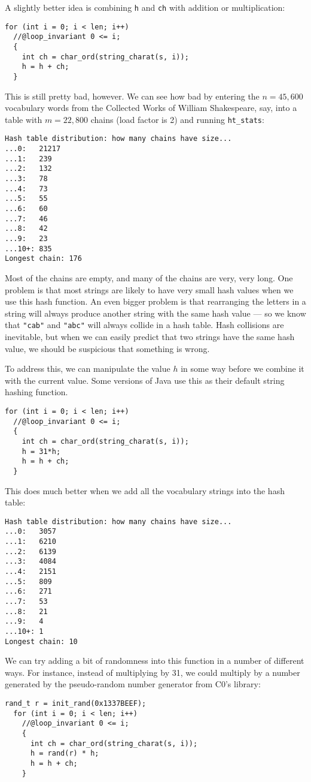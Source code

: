 A slightly better idea is combining \lstinline'h' and \lstinline'ch' with
addition or multiplication:
\begin{lstlisting}[language={[C0]C}]
  for (int i = 0; i < len; i++)
  //@loop_invariant 0 <= i;
  {
    int ch = char_ord(string_charat(s, i));
    h = h + ch;
  }
\end{lstlisting}

\noindent
This is still pretty bad, however. We can see how bad by entering the
$n = 45,600$ vocabulary words from the Collected Works of William
Shakespeare, say, into a table with $m = 22,800$ chains (load factor
is 2) and running \lstinline'ht_stats':
\begin{lstlisting}[language={[coin]C}]
Hash table distribution: how many chains have size...
...0:   21217
...1:   239
...2:   132
...3:   78
...4:   73
...5:   55
...6:   60
...7:   46
...8:   42
...9:   23
...10+: 835
Longest chain: 176
\end{lstlisting}
Most of the chains are empty, and many of the chains are very, very
long.  One problem is that most strings are likely to have very small
hash values when we use this hash function. An even bigger problem is
that rearranging the letters in a string will always produce another
string with the same hash value --- so we know that \lstinline'"cab"' and
\lstinline'"abc"' will always collide in a hash table. Hash collisions are
inevitable, but when we can easily predict that two strings have the
same hash value, we should be suspicious that something is wrong.

To address this, we can manipulate the value $h$ in some way before we
combine it with the current value. Some versions of Java use this as their
default string hashing function.
\begin{lstlisting}[language={[C0]C}]
  for (int i = 0; i < len; i++)
  //@loop_invariant 0 <= i;
  {
    int ch = char_ord(string_charat(s, i));
    h = 31*h;
    h = h + ch;
  }
\end{lstlisting}

\noindent
This does much better when we add all the vocabulary strings into the
hash table:
\begin{lstlisting}[language={[coin]C}]
Hash table distribution: how many chains have size...
...0:   3057
...1:   6210
...2:   6139
...3:   4084
...4:   2151
...5:   809
...6:   271
...7:   53
...8:   21
...9:   4
...10+: 1
Longest chain: 10
\end{lstlisting}

We can try adding a bit of randomness into this function in a number
of different ways. For instance, instead of multiplying by 31, we
could multiply by a number generated by the pseudo-random number
generator from C0's library:
\begin{lstlisting}[language={[C0]C}]
  rand_t r = init_rand(0x1337BEEF);
  for (int i = 0; i < len; i++)
    //@loop_invariant 0 <= i;
    {
      int ch = char_ord(string_charat(s, i));
      h = rand(r) * h;
      h = h + ch;
    }
  \end{lstlisting}

